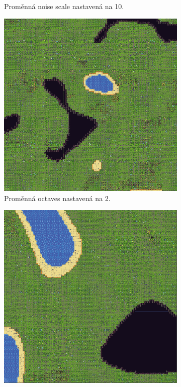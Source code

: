 \begin{figure}[H]
\begin{subfigure}{0.475\textwidth}
		\caption{Proměnná noise scale nastavená na 10.}
	\end{subfigure}
	\begin{subfigure}{0.475\textwidth}
		\centering
		\includegraphics[scale=0.52]{obrazky-figures/NoiseOctaves2.png}
		\caption{Proměnná octaves nastavená na 2.}
	\end{subfigure}
	\begin{subfigure}{0.475\textwidth}
		\centering
		\includegraphics[scale=0.435]{obrazky-figures/NoiseSeed1.png}

\end{subfigure}
\end{figure}
